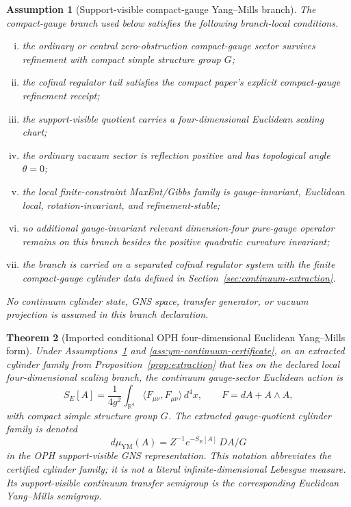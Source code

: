 \documentclass[11pt]{article}
\numberwithin{equation}{section}
\newtheorem{theorem}{Theorem}[section]
\newtheorem{assumption}[theorem]{Assumption}
\theoremstyle{remark}
\newcommand{\YM}{\mathrm{YM}}
\newcommand{\R}{\mathbb R}
\begin{document}
\begin{assumption}[Support-visible compact-gauge Yang--Mills branch]
\label{ass:ym-branch}
The compact-gauge branch used below satisfies the following branch-local conditions.
\begin{enumerate}[(i)]
\item the ordinary or central zero-obstruction compact-gauge sector survives refinement with compact simple structure group \(G\);
\item the cofinal regulator tail satisfies the compact paper's explicit compact-gauge refinement receipt;
\item the support-visible quotient carries a four-dimensional Euclidean scaling chart;
\item the ordinary vacuum sector is reflection positive and has topological angle \(\theta=0\);
\item the local finite-constraint MaxEnt/Gibbs family is gauge-invariant, Euclidean local, rotation-invariant, and refinement-stable;
\item no additional gauge-invariant relevant dimension-four pure-gauge operator remains on this branch besides the positive quadratic curvature invariant;
\item the branch is carried on a separated cofinal regulator system with the finite compact-gauge
cylinder data defined in Section~\ref{sec:continuum-extraction}.
\end{enumerate}
No continuum cylinder state, GNS space, transfer generator, or vacuum projection is assumed in
this branch declaration.
\end{assumption}

\begin{theorem}[Imported conditional OPH four-dimensional Euclidean Yang--Mills form]
\label{thm:ym-form}
Under Assumptions~\ref{ass:ym-branch} and \ref{ass:ym-continuum-certificate}, on an extracted cylinder family from
Proposition~\ref{prop:extraction} that lies on the declared local four-dimensional scaling branch,
the continuum gauge-sector Euclidean action is
\[
S_E[A]=\frac{1}{4g^2}\int_{\R^4}
\langle F_{\mu\nu},F_{\mu\nu}\rangle\,d^4x,
\qquad
F=dA+A\wedge A,
\tag{YM}
\]
with compact simple structure group \(G\). The extracted gauge-quotient cylinder family is denoted
\[
d\mu_{\YM}(A)=Z^{-1}e^{-S_E[A]}\,D A/G
\]
in the OPH support-visible GNS representation. This notation abbreviates the certified cylinder
family; it is not a literal infinite-dimensional Lebesgue measure. Its support-visible continuum
transfer semigroup is the corresponding Euclidean Yang--Mills semigroup.
\end{theorem}
\end{document}
